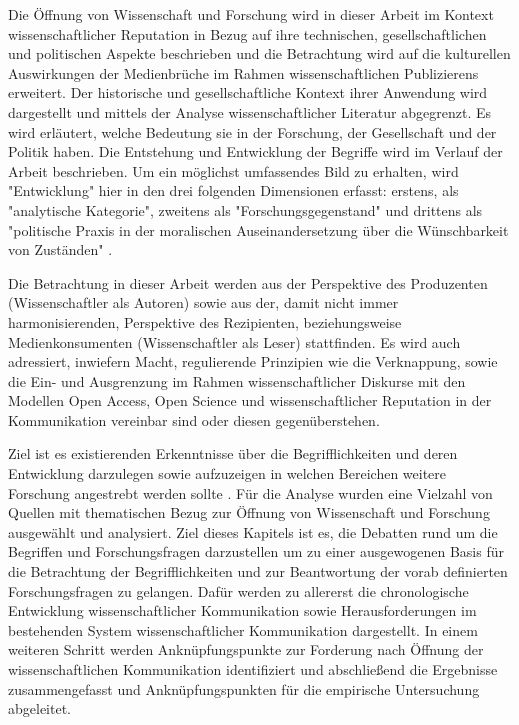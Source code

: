 Die Öffnung von Wissenschaft und Forschung wird in dieser Arbeit im Kontext wissenschaftlicher Reputation in Bezug auf ihre technischen, gesellschaftlichen und politischen Aspekte beschrieben und die Betrachtung wird auf die kulturellen Auswirkungen der Medienbrüche im Rahmen wissenschaftlichen Publizierens erweitert. Der historische und gesellschaftliche Kontext ihrer Anwendung wird dargestellt und mittels der Analyse wissenschaftlicher Literatur abgegrenzt. Es wird erläutert, welche Bedeutung sie in der Forschung, der Gesellschaft und der Politik haben. Die Entstehung und Entwicklung der Begriffe wird im Verlauf der Arbeit beschrieben. Um ein möglichst umfassendes Bild zu erhalten, wird "Entwicklung" hier in den drei folgenden Dimensionen erfasst: erstens, als "analytische Kategorie", zweitens als "Forschungsgegenstand" und drittens als "politische Praxis in der moralischen Auseinandersetzung über die Wünschbarkeit von Zuständen" \cite{cite:10}.

Die Betrachtung in dieser Arbeit werden aus der Perspektive des Produzenten (Wissenschaftler als Autoren) sowie aus der, damit nicht immer harmonisierenden, Perspektive des Rezipienten, beziehungsweise Medienkonsumenten (Wissenschaftler als Leser) stattfinden. Es wird auch adressiert, inwiefern Macht, regulierende Prinzipien wie die Verknappung, sowie die Ein- und Ausgrenzung im Rahmen wissenschaftlicher Diskurse mit den Modellen Open Access, Open Science und wissenschaftlicher Reputation in der Kommunikation vereinbar sind oder diesen gegenüberstehen.

Ziel ist es existierenden Erkenntnisse über die Begrifflichkeiten und deren Entwicklung darzulegen sowie aufzuzeigen in welchen Bereichen weitere Forschung angestrebt werden sollte \cite{webster2002analyzing}. Für die Analyse wurden eine Vielzahl von Quellen mit thematischen Bezug zur Öffnung von Wissenschaft und Forschung ausgewählt und analysiert. Ziel dieses Kapitels ist es, die Debatten rund um die Begriffen und Forschungsfragen darzustellen um zu einer ausgewogenen Basis für die Betrachtung der Begrifflichkeiten und zur Beantwortung der vorab definierten Forschungsfragen zu gelangen. Dafür werden zu allererst die chronologische Entwicklung wissenschaftlicher Kommunikation sowie Herausforderungen im bestehenden System wissenschaftlicher Kommunikation dargestellt. In einem weiteren Schritt werden Anknüpfungspunkte zur Forderung nach Öffnung der wissenschaftlichen Kommunikation identifiziert und abschließend die Ergebnisse zusammengefasst und Anknüpfungspunkten für die empirische Untersuchung abgeleitet.


